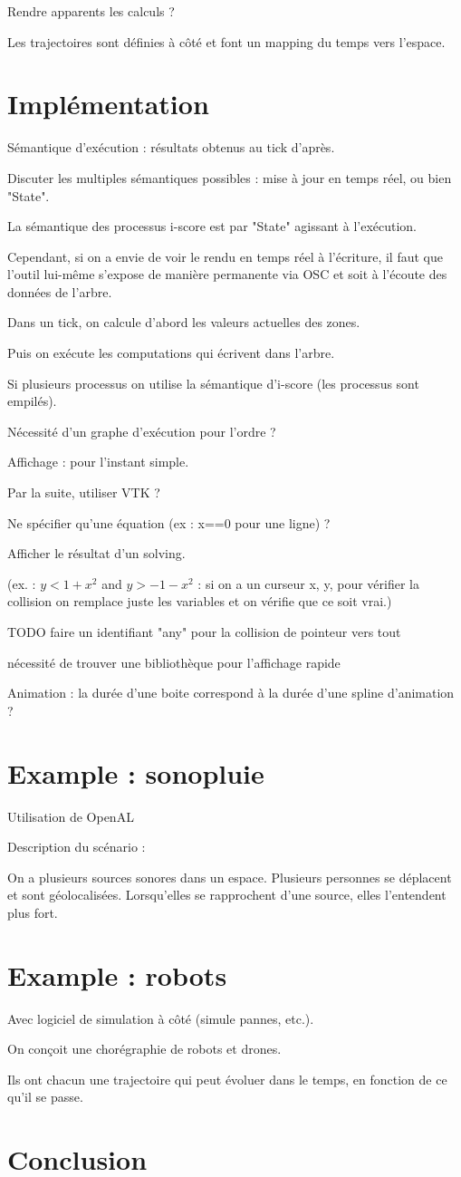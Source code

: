 \documentclass[french]{article}
\begin{document}
Rendre apparents les calculs ?

Les trajectoires sont définies à côté et font un mapping du temps vers l'espace.
\section{Implémentation}

Sémantique d'exécution : résultats obtenus au tick d'après.

Discuter les multiples sémantiques possibles : mise à jour en temps réel, ou bien "State".

La sémantique des processus i-score est par "State" agissant à l'exécution.

Cependant, si on a envie de voir le rendu en temps réel à l'écriture, 
il faut que l'outil lui-même s'expose de manière permanente via OSC 
et soit à l'écoute des données de l'arbre.


Dans un tick, on calcule d'abord les valeurs actuelles des zones.

Puis on exécute les computations qui écrivent dans l'arbre.

Si plusieurs processus on utilise la sémantique d'i-score (les processus sont empilés).

Nécessité d'un graphe d'exécution pour l'ordre ?

Affichage : pour l'instant simple. 

Par la suite, utiliser VTK ?

Ne spécifier qu'une équation (ex : x==0 pour une ligne) ?

Afficher le résultat d'un solving.

(ex. : $y < 1 + x^2$ and $y > -1 -x^2$ : si on a un curseur x, y, pour vérifier la collision on remplace juste les variables et on vérifie que ce soit vrai.)

TODO faire un identifiant "any" pour la collision de pointeur vers tout

nécessité de trouver une bibliothèque pour l'affichage rapide
 
 Animation : la durée d'une boite correspond à la durée d'une spline d'animation ?
\section{Example : sonopluie}
Utilisation de OpenAL

Description du scénario : 

On a plusieurs sources sonores dans un espace.
Plusieurs personnes se déplacent et sont géolocalisées.
Lorsqu'elles se rapprochent d'une source, elles l'entendent plus fort.

\section{Example : robots}
Avec logiciel de simulation à côté (simule pannes, etc.).

On conçoit une chorégraphie de robots et drones.

Ils ont chacun une trajectoire qui peut évoluer dans le temps, en fonction de ce qu'il se passe.
\section{Conclusion}
\end{document}
